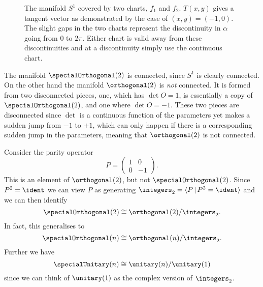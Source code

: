 \begin{figure}
    \caption[The manifold \(S^1\)]{The manifold \(S^1\) covered by two charts, \(f_1\) and \(f_2\). \(T(x, y)\) gives a tangent vector as demonstrated by the case of \((x, y) = (-1, 0)\). The slight gaps in the two charts represent the discontinuity in \(\alpha\) going from 0 to \(2\pi\). Either chart is valid away from these discontinuities and at a discontinuity simply use the continuous chart.}
\end{figure}

The manifold \(\specialOrthogonal(2)\) is connected, since \(S^1\) is clearly connected.
On the other hand the manifold \(\orthogonal(2)\) is \emph{not} connected.
It is formed from two disconnected pieces, one, which has \(\det O = 1\), is essentially a copy of \(\specialOrthogonal(2)\), and one where \(\det O = -1\).
These two pieces are disconnected since \(\det\) is a continuous function of the parameters yet makes a sudden jump from \(-1\) to \(+1\), which can only happen if there is a corresponding sudden jump in the parameters, meaning that \(\orthogonal(2)\) is not connected.

Consider the parity operator
\begin{equation}
    P = 
    \begin{pmatrix}
        1 & 0\\
        0 & -1
    \end{pmatrix}
    .
\end{equation}
This is an element of \(\orthogonal(2)\), but not \(\specialOrthogonal(2)\).
Since \(P^2 = \ident\) we can view \(P\) as generating \(\integers_2 = \presentation{P}{P^2 = \ident}\) and we can then identify
\begin{equation}
    \specialOrthogonal(2) \isomorphic \orthogonal(2) / \integers_2.
\end{equation}
In fact, this generalises to
\begin{equation}
    \specialOrthogonal(n) \isomorphic \orthogonal(n) / \integers_2.
\end{equation}
Further we have
\begin{equation}
    \specialUnitary(n) \isomorphic \unitary(n) / \unitary(1)
\end{equation}
since we can think of \(\unitary(1)\) as the complex version of \(\integers_2\).

